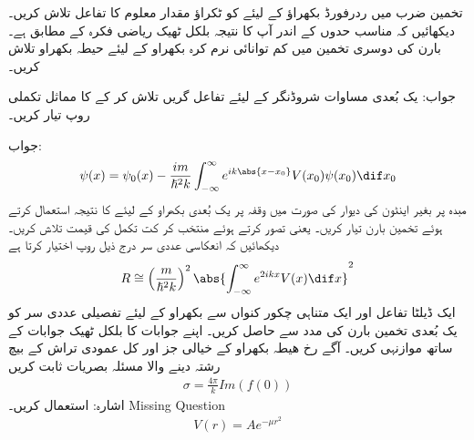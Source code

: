 تخمین ضرب میں ردرفورڈ بکھراؤ کے لیئے  کو ٹکراؤ مقدار معلوم کا تفاعل تلاش کریں۔ دیکھائیں کہ مناسب حدوں کے اندر آپ کا نتیجہ بلکل ٹھیک ریاضی فکرہ  کے مطابق ہے۔
بارن کی دوسری تخمین میں کم توانائی نرم کرہ بکھراو کے لیئے حیطہ بکھراو تلاش کریں۔

جواب: 
یک بُعدی مساوات شروڈنگر کے لیئے تفاعل گریں تلاش کر کے  کا مماثل تکملی روپ تیار کریں۔

جواب:
\begin{align}
	\psi(x)=\psi_0(x)-\frac{im}{\hslash^2k}\int_{-\infty}^{\infty}e^{ik\abs{x-x_0}}V(x_0)\psi(x_0)\dif x_0
\end{align}
مبدہ پر بغیر اینٹون کی دیوار کی صورت میں وقفہ  پر یک بُعدی بکھراو کے لیئے  کا نتیجہ استعمال کرتے ہوئے تخمین بارن تیار کریں۔ یعنی  تصور کرتے ہوئے  منتخب کر کت تکمل کی قیمت تلاش کریں۔ دیکھائیں کہ انعکاسی عددی سر درج ذیل روپ اختیار کرتا ہے
\begin{align}
	R\cong\left(\frac{m}{\hslash^2k}\right)^2\abs{\int_{-\infty}^{\infty}e^{2ikx}V(x)\dif x}^2
\end{align}
ایک ڈیلٹا تفاعل  اور ایک متناہی چکور کنواں  سے بکھراو کے لیئے تفصیلی عددی سر  کو یک بُعدی تخمین بارن  کی مدد سے حاصل کریں۔ اپنے جوابات کا بلکل ٹھیک جوابات  کے ساتھ موازنہی کریں۔
آگے رخ ھیطہ بکھراو کے خیالی جز اور کل عمودی تراش کے بیچ رشتہ دینے والا مسئلہ بصریات ثابت کریں 
\begin{align}
	\sigma = \frac{4\pi}{k}Im(f(0))
\end{align}
اشارہ:  استعمال کریں۔
Missing Question
\begin{align}
	V(r) = Ae^{-\mu r^2}
\end{align}

